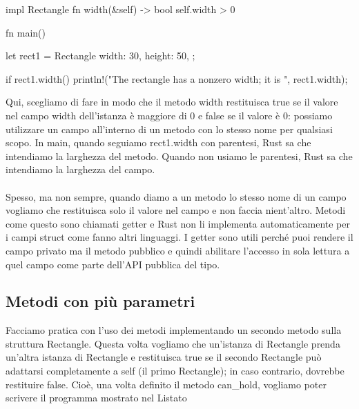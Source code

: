 \documentclass[11pt,a4paper]{article}
\begin{document}
\begin{rust}
impl Rectangle {
    fn width(&self) -> bool {
        self.width > 0
    }
}

fn main() {
    let rect1 = Rectangle {
        width: 30,
        height: 50,
    };

    if rect1.width() {
        println!("The rectangle has a nonzero width; it is {}", rect1.width);
    }
}
\end{rust}

Qui, scegliamo di fare in modo che il metodo width restituisca true se il valore nel campo width dell'istanza è maggiore di 0 e false se il valore è 0: possiamo utilizzare un campo all'interno di un metodo con lo stesso nome per qualsiasi scopo. In main, quando seguiamo rect1.width con parentesi, Rust sa che intendiamo la larghezza del metodo. Quando non usiamo le parentesi, Rust sa che intendiamo la larghezza del campo.\\
\\
Spesso, ma non sempre, quando diamo a un metodo lo stesso nome di un campo vogliamo che restituisca solo il valore nel campo e non faccia nient'altro. Metodi come questo sono chiamati getter e Rust non li implementa automaticamente per i campi struct come fanno altri linguaggi. I getter sono utili perché puoi rendere il campo privato ma il metodo pubblico e quindi abilitare l'accesso in sola lettura a quel campo come parte dell'API pubblica del tipo.

\subsection{Metodi con più parametri}

Facciamo pratica con l'uso dei metodi implementando un secondo metodo sulla struttura Rectangle. Questa volta vogliamo che un'istanza di Rectangle prenda un'altra istanza di Rectangle e restituisca true se il secondo Rectangle può adattarsi completamente a self (il primo Rectangle); in caso contrario, dovrebbe restituire false. Cioè, una volta definito il metodo can\_hold, vogliamo poter scrivere il programma mostrato nel Listato
\end{document}
